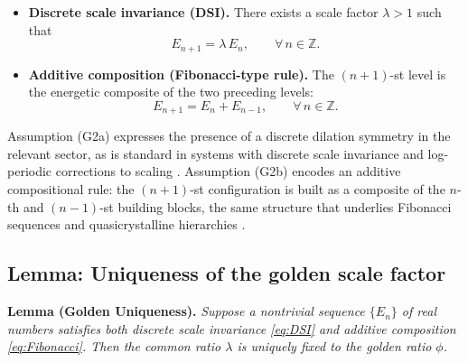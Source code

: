 \documentclass[10pt,reprint,aps,onecolumn,nofootinbib]{revtex4-2}
\begin{document}
        \begin{itemize}
            \item[(G2a)] \textbf{Discrete scale invariance (DSI).} There exists a
            scale factor $\lambda>1$ such that
            \begin{equation}
                E_{n+1} = \lambda\,E_n,
                \qquad
                \forall\,n\in\mathbb{Z}.
                \label{eq:DSI}
            \end{equation}

            \item[(G2b)] \textbf{Additive composition (Fibonacci-type rule).} The
            $(n+1)$-st level is the energetic composite of the two preceding
            levels:
            \begin{equation}
                E_{n+1} = E_n + E_{n-1},
                \qquad
                \forall\,n\in\mathbb{Z}.
                \label{eq:Fibonacci}
            \end{equation}
        \end{itemize}

        Assumption (G2a) expresses the presence of a discrete dilation symmetry
        in the relevant sector, as is standard in systems with discrete scale
        invariance and log-periodic corrections to scaling
        \cite{Sornette1998,GluzmanSornette2002}. Assumption (G2b) encodes an
        additive compositional rule: the $(n+1)$-st configuration is built as a
        composite of the $n$-th and $(n-1)$-st building blocks, the same
        structure that underlies Fibonacci sequences and quasicrystalline
        hierarchies \cite{BaakeGrimm2013}.

    \subsection{Lemma: Uniqueness of the golden scale factor}

        \textbf{Lemma (Golden Uniqueness).}
        \emph{Suppose a nontrivial sequence $\{E_n\}$ of real numbers satisfies
        both discrete scale invariance \eqref{eq:DSI} and additive composition
        \eqref{eq:Fibonacci}. Then the common ratio $\lambda$ is uniquely fixed
        to the golden ratio $\phi$.}
\end{document}
